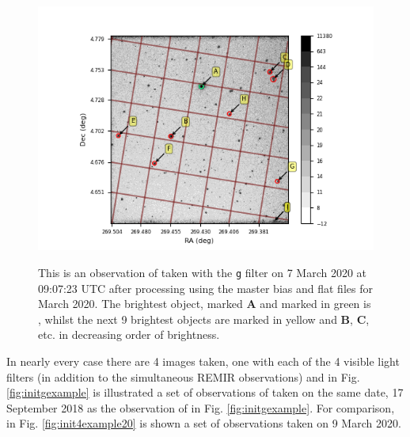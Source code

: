 \begin{figure}[!htbp]
\begin{center}
\includegraphics[scale=1]{images/initgexample20.png}
\end{center}   
\caption{This is an observation of {\bstar} taken with the \texttt{g} filter on
7 March 2020 at 09:07:23 UTC after processing using the master bias and
flat files for March 2020. The brightest object, marked \textbf{A} and marked in
green is \bstar, whilst the next 9 brightest objects are marked in yellow and
\textbf{B}, \textbf{C}, etc. in decreasing order of brightness.}
\protect\label{fig:initgexample20}
\end{figure}

In nearly every case there are 4 images taken, one with each of the 4 visible
light filters (in addition to the simultaneous REMIR observations) and in Fig.
\ref{fig:initgexample} is illustrated a set of observations of {\prox} taken on
the same date, 17 September 2018 as the observation of {\bstar} in Fig.
\ref{fig:initgexample}. For comparison, in Fig. \ref{fig:init4example20} is
shown a set of observations taken on 9 March 2020.

